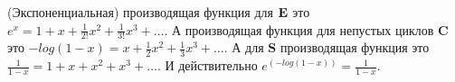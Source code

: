 \begin{example}
(Экспоненциальная) производящая функция для $\mathbf E$ это $e^x = 1 + x +
\frac{1}{2!}x^2 + \frac{1}{3!}x^3 + \dots$. А производящая функция для
непустых циклов $\mathbf C$ это $-log(1-x) = x + \frac{1}{2}x^2 +
\frac{1}{3}x^3 + \dots$.
А для $\mathbf S$ производящая функция это $\frac{1}{1-x} = 1 + x + x^2 + x^3 +
\dots$.
И действительно $e^(-log(1-x)) = \frac{1}{1-x}$.
\end{example}

